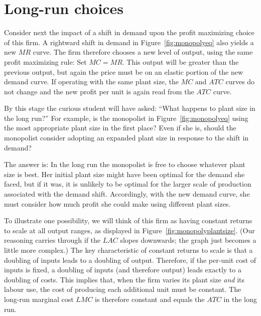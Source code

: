 \section{Long-run choices}\label{sec:ch10sec3}

Consider next the impact of a shift in demand upon the profit maximizing
choice of this firm. A rightward shift in demand in Figure~\ref{fig:monopolyeq}
also yields a new $MR$ curve. The firm therefore chooses a
new level of output, using the same profit maximizing rule: Set $MC=MR$.
This output will be greater than the previous output, but again the price
must be on an elastic portion of the new demand curve. If operating with the
same plant size, the $MC$ and $ATC$ curves do not change and the new profit
per unit is again read from the $ATC$ curve.

By this stage the curious student will have asked: ``What happens to plant
size in the long run?'' For example, is the monopolist in Figure~\ref{fig:monopolyeq}
using the most appropriate plant size in the first place?
Even if she is, should the monopolist consider adopting an expanded plant
size in response to the shift in demand?

The answer is: In the long run the monopolist is free to choose whatever
plant size is best. Her initial plant size might have been optimal for the
demand she faced, but if it was, it is unlikely to be optimal for the larger
scale of production associated with the demand shift. Accordingly, with the
new demand curve, she must consider how much profit she could make using
different plant sizes.

\newhtmlpage



To illustrate one possibility, we will think of this firm as having constant
returns to scale at all output ranges, as displayed in Figure~\ref{fig:monopolyplantsize}.
(Our reasoning carries through if the $LAC$ slopes
downwards; the graph just becomes a little more complex.) The key
characteristic of constant returns to scale is that a doubling of inputs
leads to a doubling of output. Therefore, if the per-unit cost of inputs is
fixed, a doubling of inputs (and therefore output) leads exactly to a
doubling of costs. This implies that, when the firm varies its plant size 
\textit{and} its labour use, the cost of producing each additional unit must
be constant. The long-run marginal cost $LMC$ is therefore constant and
equals the $ATC$ in the long run.

